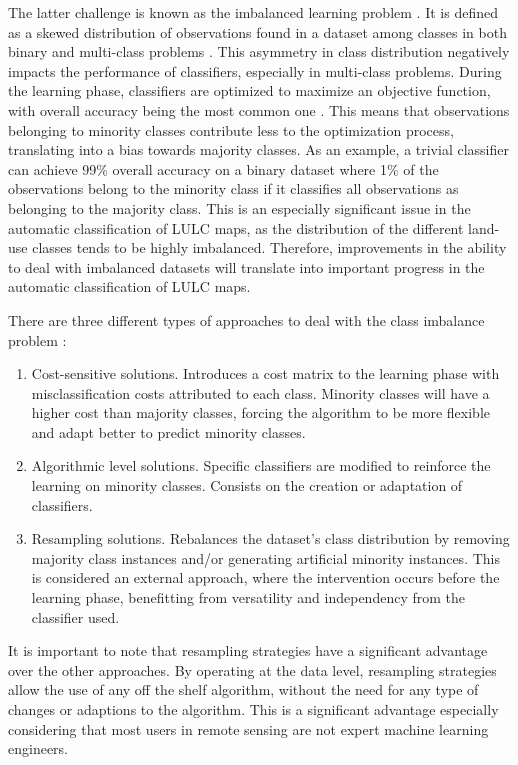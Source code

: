 \documentclass[parskip=full]{scrartcl}
\begin{document}
The latter challenge is known as the imbalanced learning problem
\cite{Chawla2004}. It is defined as a skewed distribution of observations found
in a dataset among classes in both binary and multi-class problems
\cite{Abdi2016}. This asymmetry in class distribution negatively impacts the
performance of classifiers, especially in multi-class problems. During the
learning phase, classifiers are optimized to maximize an objective function,
with overall accuracy being the most common one \cite{Maxwell2018}. This means
that observations belonging to minority classes contribute less to the
optimization process, translating into a bias towards majority classes.  As an
example, a trivial classifier can achieve 99\% overall accuracy on a binary
dataset where 1\% of the observations belong to the minority class if it
classifies all observations as belonging to the majority class. This is an
especially significant issue in the automatic classification of LULC maps, as
the distribution of the different land-use classes tends to be highly
imbalanced. Therefore, improvements in the ability to deal with imbalanced
datasets will translate into important progress in the automatic classification
of LULC maps.

There are three different types of approaches to deal with the class imbalance
problem \cite{Fernandez2013,Kaur2019}:

\begin{enumerate}
    \item Cost-sensitive solutions. Introduces a cost matrix to the learning
        phase with misclassification costs attributed to each class. Minority
        classes will have a higher cost than majority classes, forcing the
        algorithm to be more flexible and adapt better to predict minority
        classes.
    \item Algorithmic level solutions. Specific classifiers are modified to
        reinforce the learning on minority classes. Consists on the creation or
        adaptation of classifiers.
    \item Resampling solutions. Rebalances the dataset's class distribution by
        removing majority class instances and/or generating artificial minority
        instances. This is considered an external approach, where the
        intervention occurs before the learning phase, benefitting from
        versatility and independency from the classifier used.
\end{enumerate}

It is important to note that resampling strategies have a significant advantage
over the other approaches. By operating at the data level, resampling strategies
allow the use of any off the shelf algorithm, without the need for any type of
changes or adaptions to the algorithm. This is a significant advantage
especially considering that most users in remote sensing are not expert machine
learning engineers. 
\end{document}
